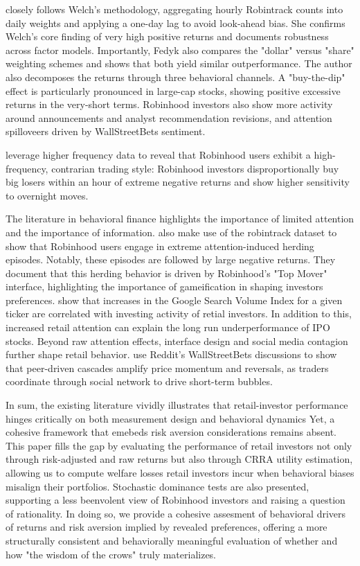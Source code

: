 \cite{Fedyk2024} closely follows Welch's methodology, aggregating hourly Robintrack counts into daily weights and applying a one-day lag to avoid look-ahead bias. 
She confirms Welch's core finding of very high positive returns and documents robustness across factor models. 
Importantly, Fedyk also compares the "dollar" versus "share" weighting schemes and shows that both yield similar outperformance.
The author also decomposes the returns through three behavioral channels.
A "buy-the-dip" effect is particularly pronounced in large-cap stocks, showing positive excessive returns in the very-short terms.
Robinhood investors also show more activity around announcements and analyst recommendation revisions,
and attention spilloveers driven by WallStreetBets sentiment. 

\cite{ardia2023fastfurioushighfrequencyanalysis} leverage higher frequency data to reveal that Robinhood users exhibit a high-frequency, contrarian trading style:
Robinhood investors disproportionally buy big losers within an hour of extreme negative returns and show higher sensitivity to overnight moves.

The literature in behavioral finance highlights the importance of limited attention and the importance of information.
\cite{barber2021robinhood} also make use of the robintrack dataset to show that Robinhood users engage in extreme attention-induced herding episodes.
Notably, these episodes are followed by large negative returns.
They document that this herding behavior is driven by Robinhood's "Top Mover" interface, highlighting the importance of gameification in shaping investors preferences. 
\cite{zhi2009} show that increases in the Google Search Volume Index for a given ticker are correlated with investing activity of retial investors.
In addition to this, increased retail attention can explain the long run underperformance of IPO stocks.
Beyond raw attention effects, interface design and social media contagion further shape retail behavior.
\cite{semenova2023socialcontagionassetprices} use Reddit's WallStreetBets discussions to show that peer-driven cascades amplify price momentum and reversals,
as traders coordinate through social network to drive short-term bubbles.

In sum, the existing literature vividly illustrates that retail-investor performance hinges critically on both measurement design and behavioral dynamics
Yet, a cohesive framework that emebeds risk aversion considerations remains absent.
This paper fills the gap by evaluating the performance of retail investors not only through risk-adjusted and raw returns but also 
through CRRA utility estimation, allowing us to compute welfare losses retail investors incur when behavioral biases misalign their portfolios.
Stochastic dominance tests are also presented, supporting a less beenvolent view of Robinhood investors and raising a question of rationality.
In doing so, we provide a cohesive assesment of behavioral drivers of returns and risk aversion implied by revealed preferences,
offering a more structurally consistent and behaviorally meaningful evaluation of whether and how "the wisdom of the crows" truly materializes.

